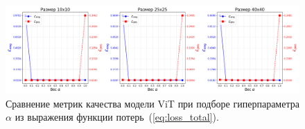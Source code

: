 \documentclass[a4paper,12pt]{extarticle}
\begin{document}
\begin{figure}[ht]
    \centering
    \includegraphics[width=1.0\textwidth]{graphics/exp3_alpha_std_extra.png}
    \caption{Сравнение метрик качества модели \textsf{ViT} при подборе гиперпараметра $\alpha$ из выражения функции потерь~(\ref{eq:loss_total}).}
    \label{graph:alpha_extra}
\end{figure}
\end{document}
